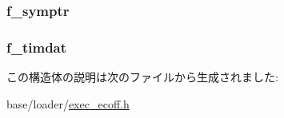 \label{structecoff__filehdr_ad9d55b306f22e5bc247efc29c6c4db6d}
\hypertarget{structecoff__filehdr_ac2de3677fe0525a3569984e5d035cd74}{
\subsubsection[{f\_\-symptr}]{ {\bf f\_\-symptr}}}
\label{structecoff__filehdr_ac2de3677fe0525a3569984e5d035cd74}
\hypertarget{structecoff__filehdr_a1ec9f8bf7c9a35813703ff2cdd9a6b9a}{
\subsubsection[{f\_\-timdat}]{ {\bf f\_\-timdat}}}
\label{structecoff__filehdr_a1ec9f8bf7c9a35813703ff2cdd9a6b9a}


この構造体の説明は次のファイルから生成されました:\begin{DoxyCompactItemize}
\item 
base/loader/\hyperlink{exec__ecoff_8h}{exec\_\-ecoff.h}\end{DoxyCompactItemize}
